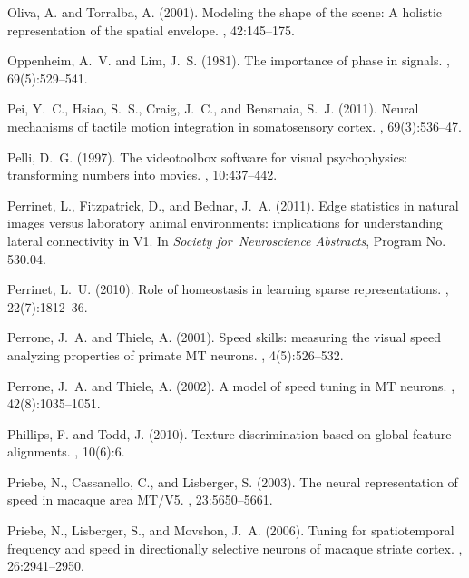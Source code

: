 \documentclass[a4paper,11pt]{article}%
\begin{document}
\begin{thebibliography}{}
Oliva, A. and Torralba, A. (2001).
\newblock Modeling the shape of the scene: A holistic representation of the
  spatial envelope.
, 42:145--175.

Oppenheim, A.~V. and Lim, J.~S. (1981).
\newblock The importance of phase in signals.
, 69(5):529--541.

Pei, Y.~C., Hsiao, S.~S., Craig, J.~C., and Bensmaia, S.~J. (2011).
\newblock Neural mechanisms of tactile motion integration in somatosensory
  cortex.
, 69(3):536--47.

Pelli, D.~G. (1997).
\newblock The videotoolbox software for visual psychophysics: transforming
  numbers into movies.
, 10:437--442.

Perrinet, L., Fitzpatrick, D., and Bednar, J.~A. (2011).
\newblock Edge statistics in natural images versus laboratory animal
  environments: implications for understanding lateral connectivity in {V1}.
\newblock In {\em Society for~Neuroscience Abstracts}, Program No. 530.04.

Perrinet, L.~U. (2010).
\newblock Role of homeostasis in learning sparse representations.
, 22(7):1812--36.

Perrone, J.~A. and Thiele, A. (2001).
\newblock Speed skills: measuring the visual speed analyzing properties of
  primate {MT} neurons.
, 4(5):526--532.

Perrone, J.~A. and Thiele, A. (2002).
\newblock A model of speed tuning in {MT} neurons.
, 42(8):1035--1051.

Phillips, F. and Todd, J. (2010).
\newblock Texture discrimination based on global feature alignments.
, 10(6):6.

Priebe, N., Cassanello, C., and Lisberger, S. (2003).
\newblock The neural representation of speed in macaque area {MT/V5}.
, 23:5650--5661.

Priebe, N., Lisberger, S., and Movshon, J.~A. (2006).
\newblock Tuning for spatiotemporal frequency and speed in directionally
  selective neurons of macaque striate cortex.
, 26:2941--2950.


\end{thebibliography}
\end{document}
